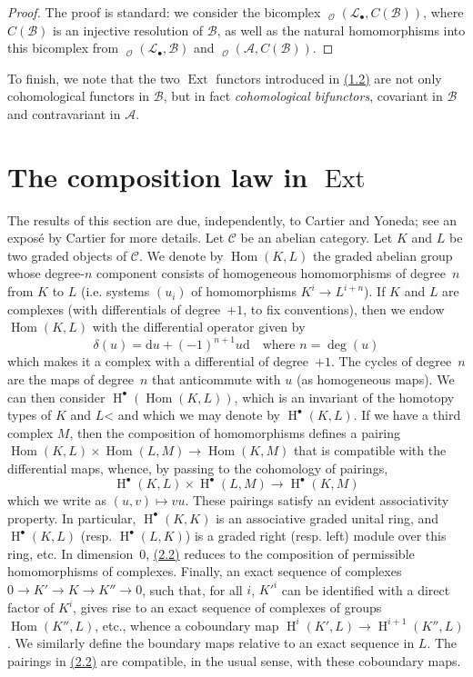 \documentclass{article}
\theoremstyle{plain}
\theoremstyle{definition}
\newcommand{\scr}[1]{{\mathscr{#1}}}
\renewcommand{\cal}[1]{{\mathcal{#1}}}
\DeclareMathOperator{\Ext}{Ext}
\DeclareMathOperator{\Hom}{Hom}
\DeclareMathOperator{\shHom}{\underline{Hom}}
\DeclareMathOperator{\HH}{H}
\newcommand{\oldpage}[1]{\marginpar{\footnotesize$\Big\vert$ \textit{p.~#1}}}
\begin{document}
\begin{proof}
  The proof is standard: we consider the bicomplex $\shHom_\scr{O}(\scr{L}_\bullet,C(\scr{B}))$, where $C(\scr{B})$ is an injective resolution of $\scr{B}$, as well as the natural homomorphisms into this bicomplex from $\shHom_\scr{O}(\scr{L}_\bullet,\scr{B})$ and $\shHom_\scr{O}(\scr{A},C(\scr{B}))$.
\end{proof}

To finish, we note that the two $\Ext$ functors introduced in \hyperref[1.2]{(1.2)} are not only cohomological functors in $\scr{B}$, but in fact \emph{cohomological bifunctors}, covariant in $\scr{B}$ and contravariant in $\scr{A}$.


\section{The composition law in \texorpdfstring{$\Ext$}{Ext}}
\label{section2}

The results of this section are due, independently, to Cartier and Yoneda;
see an expos\'{e} by Cartier \cite{1} for more details.
Let $\cal{C}$ be an abelian category.
Let $K$ and $L$ be two graded objects of $\cal{C}$.
We denote by $\Hom(K,L)$ the graded abelian group whose degree-$n$ component consists of homogeneous homomorphisms of degree~$n$ from $K$ to $L$ (i.e. systems $(u_i)$ of homomorphisms $K^i\to L^{i+n}$).
If $K$ and $L$ are complexes (with differentials of degree~$+1$, to fix conventions), then we endow $\Hom(K,L)$ with the differential operator given by
\[
\label{2.1}
  \delta(u) = \mathrm{d}u + (-1)^{n+1}u\mathrm{d}
  \quad\text{where }n=\deg(u)
\tag{2.1}
\]
which makes it a complex with a differential of degree~$+1$.
The cycles of degree~$n$ are the maps of degree~$n$ that anticommute with $u$ (as homogeneous maps).
We can then consider $\HH^\bullet(\Hom(K,L))$, which is an invariant of the homotopy types of $K$ and $L$< and which we may denote by $\HH^\bullet(K,L)$.
If we have a third complex $M$, then the composition of homomorphisms defines a pairing $\Hom(K,L)\times\Hom(L,M)\to\Hom(K,M)$ that is compatible with the differential maps, whence, by passing to the cohomology of pairings,
\[
\label{2.2}
  \HH^\bullet(K,L)\times\HH^\bullet(L,M) \to \HH^\bullet(K,M)
\tag{2.2}
\]
which we write as $(u,v)\mapsto vu$.
These pairings satisfy an evident associativity property.
In particular, $\HH^\bullet(K,K)$ is an associative graded unital ring, and $\HH^\bullet(K,L)$ (resp. $\HH^\bullet(L,K)$) is a graded right (resp. left) module over this ring, etc.
In dimension~$0$, \hyperref[2.2]{(2.2)} reduces to the composition of permissible homomorphisms of complexes.
Finally, an exact sequence of complexes
\oldpage{149-04}
$0\to K'\to K\to K''\to0$, such that, for all $i$, $K'^i$ can be identified with a direct factor of $K^i$, gives rise to an exact sequence of complexes of groups $\Hom(K'',L)$, etc., whence a coboundary map $\HH^i(K',L)\to\HH^{i+1}(K'',L)$.
We similarly define the boundary maps relative to an exact sequence in $L$.
The pairings in \hyperref[2.2]{(2.2)} are compatible, in the usual sense, with these coboundary maps.
\end{document}
